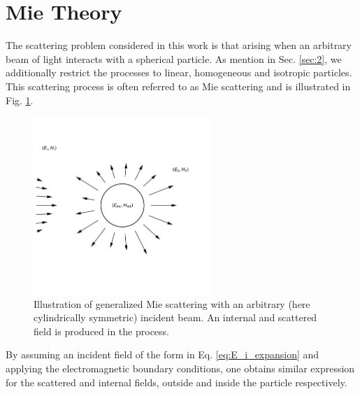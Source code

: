 \section{Mie Theory}
The scattering problem considered in this work is that arising when an arbitrary beam of light interacts with a spherical particle. As mention in Sec. \ref{sec:2}, we additionally restrict the processes to linear, homogeneous and isotropic particles. This scattering process is often referred to as Mie scattering and is illustrated in Fig. \ref{fig:glmt}. 
\begin{figure}
    \centering
    \includegraphics[trim={0 1cm 0 1cm},clip,width=0.6\textwidth]{Figures/figure.png}
    \caption{Illustration of generalized Mie scattering with an arbitrary (here cylindrically symmetric) incident beam. An internal and scattered field is produced in the process.}
    \label{fig:glmt}
\end{figure}
By assuming an incident field of the form in Eq. \ref{eq:E_i_expansion} and applying the electromagnetic boundary conditions, one obtains similar expression for the scattered and internal fields, outside and inside the particle respectively.

